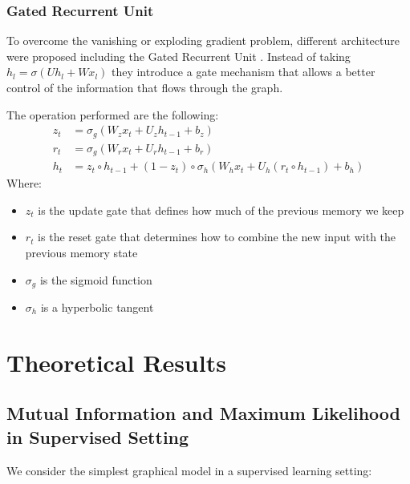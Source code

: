 \documentclass[10pt,oneside,openright]{report}
\begin{document}
\subsection{Gated Recurrent Unit}
To overcome the vanishing or exploding gradient problem, different architecture were proposed including the Gated Recurrent Unit \cite{gru}. Instead of taking $h_l = \sigma(U h_l + W x_l)$ they introduce a gate mechanism that allows a better control of the information that flows through the graph.

The operation performed are the following:
\begin{align}
z_t &= \sigma_g(W_{z} x_t + U_{z} h_{t-1} + b_z) \\
r_t &= \sigma_g(W_{r} x_t + U_{r} h_{t-1} + b_r) \\
h_t &=  z_t \circ h_{t-1} + (1-z_t) \circ \sigma_h(W_{h} x_t + U_{h} (r_t \circ h_{t-1}) + b_h)
\end{align}
Where:
\begin{itemize}
 \item $z_t$ is the update gate that defines how much of the previous memory we keep
 \item $r_t$ is the reset gate that determines how to combine the new input with the previous memory state
\item  $\sigma_g$ is the sigmoid function
\item $\sigma_h$ is a hyperbolic tangent
\end{itemize}

\chapter{Theoretical Results}
\section{Mutual Information and Maximum Likelihood in Supervised Setting}

We consider the simplest graphical model in a supervised learning setting:

\begin{center}
\end{center}
\end{document}

